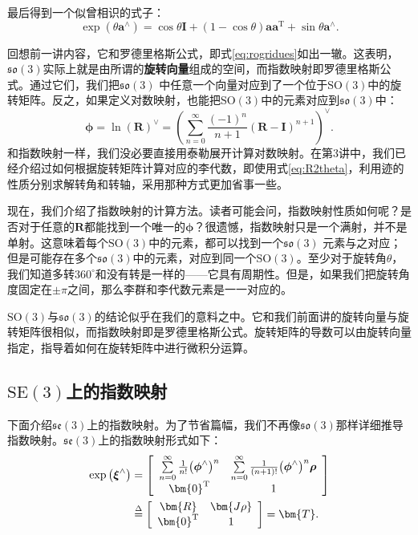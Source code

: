 最后得到一个似曾相识的式子：
\begin{equation}
\exp( \theta \bm{a}^\wedge ) = \cos \theta \bm{I} + (1 - \cos \theta )\bm{a}{\bm{a}^\mathrm{T}} + \sin \theta {\bm{a}^ \wedge }.
\end{equation}

回想前一讲内容，它和罗德里格斯公式，即式\eqref{eq:rogridues}如出一辙。这表明，$\mathfrak{so}(3)$实际上就是由所谓的\textbf{旋转向量}组成的空间，而指数映射即罗德里格斯公式。通过它们，我们把$\mathfrak{so}(3)$ 中任意一个向量对应到了一个位于$\mathrm{SO}(3)$中的旋转矩阵。反之，如果定义对数映射，也能把$\mathrm{SO}(3)$中的元素对应到$\mathfrak{so}(3)$中：
\begin{equation}
\boldsymbol{\phi}  = \ln {\left( \bm{R} \right)^ \vee } = {\left( {\sum\limits_{n = 0}^\infty  {\frac{{{{\left( { - 1} \right)}^n}}}{{n + 1}}{{\left( { \bm{R} - \bm{I}} \right)}^{n + 1}}} } \right)^ \vee }.
\end{equation}
和指数映射一样，我们没必要直接用泰勒展开计算对数映射。在第3讲中，我们已经介绍过如何根据旋转矩阵计算对应的李代数，即使用式\eqref{eq:R2theta}，利用迹的性质分别求解转角和转轴，采用那种方式更加省事一些。

现在，我们介绍了指数映射的计算方法。读者可能会问，指数映射性质如何呢？是否对于任意的$\bm{R}$都能找到一个唯一的$\boldsymbol{\phi}$？很遗憾，指数映射只是一个满射，并不是单射。这意味着每个$\mathrm{SO}(3)$中的元素，都可以找到一个$\mathfrak{so}(3)$ 元素与之对应；但是可能存在多个$\mathfrak{so}(3)$中的元素，对应到同一个$\mathrm{SO}(3)$。至少对于旋转角$\theta$，我们知道多转$360^\circ$和没有转是一样的——它具有周期性。但是，如果我们把旋转角度固定在$\pm \pi$之间，那么李群和李代数元素是一一对应的。

$\mathrm{SO}(3)$与$\mathfrak{so}(3)$的结论似乎在我们的意料之中。它和我们前面讲的旋转向量与旋转矩阵很相似，而指数映射即是罗德里格斯公式。旋转矩阵的导数可以由旋转向量指定，指导着如何在旋转矩阵中进行微积分运算。

\subsection{$\mathrm{SE}(3)$上的指数映射}

下面介绍$\mathfrak{se}(3)$上的指数映射。为了节省篇幅，我们不再像$\mathfrak{so}(3)$那样详细推导指数映射。$\mathfrak{se}(3)$上的指数映射形式如下：
\begin{align}
\exp \left( {{ \boldsymbol{\xi} ^ \wedge }} \right) &= \left[ {\begin{array}{*{20}{c}}
	{\sum\limits_{n = 0}^\infty  {\frac{1}{{n!}}{{\left( {{\boldsymbol{\phi} ^ \wedge }} \right)}^n}} }&{\sum\limits_{n = 0}^\infty  {\frac{1}{{\left( {n + 1} \right)!}}{{\left( {{\boldsymbol{\phi} ^ \wedge }} \right)}^n} \boldsymbol{\rho} } }\\
	{{\bm{0}^\mathrm{T}}}&1
	\end{array}} \right] \\
&\buildrel \Delta \over =  \left[ {\begin{array}{*{20}{c}}
	\bm{R} &{\bm{J\rho} } \\
	{{\bm{0}^\mathrm{T}}}&1
	\end{array}} \right] = \bm{T}.
\end{align}

